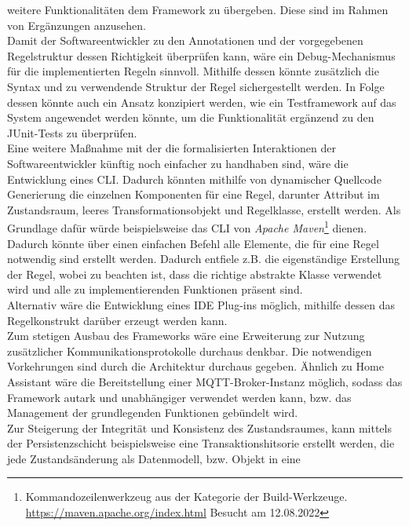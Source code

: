     weitere Funktionalitäten dem Framework zu übergeben. Diese sind im Rahmen von Ergänzungen anzusehen.
    \\
    Damit der Softwareentwickler zu den Annotationen und der vorgegebenen Regelstruktur dessen Richtigkeit überprüfen kann, wäre ein Debug-Mechanismus für die implementierten Regeln sinnvoll. 
    Mithilfe dessen könnte zusätzlich die Syntax und zu verwendende Struktur der Regel sichergestellt werden. In Folge dessen könnte auch ein Ansatz konzipiert werden, wie ein Testframework 
    auf das System angewendet werden könnte, um die Funktionalität ergänzend zu den JUnit-Tests zu überprüfen. 
    \\
    \linebreak
    Eine weitere Maßnahme mit der die formalisierten Interaktionen der Softwareentwickler künftig noch einfacher zu handhaben sind, wäre die Entwicklung eines \ac{CLI}. Dadurch könnten mithilfe 
    von dynamischer Quellcode Generierung die einzelnen Komponenten für eine Regel, darunter Attribut im Zustandsraum, leeres Transformationsobjekt und Regelklasse, erstellt werden. Als Grundlage dafür 
    würde beispielsweise das \acs{CLI} von \textit{Apache Maven}\footnote{Kommandozeilenwerkzeug aus der Kategorie der Build-Werkzeuge. \url{https://maven.apache.org/index.html} Besucht am 12.08.2022} 
    dienen. Dadurch könnte über einen einfachen Befehl alle Elemente, die für eine Regel notwendig sind erstellt werden. Dadurch entfiele z.B. die 
    eigenständige Erstellung der Regel, wobei zu beachten ist, dass die richtige abstrakte Klasse verwendet wird und alle zu implementierenden Funktionen präsent sind. 
    \\
    Alternativ wäre die Entwicklung eines \ac{IDE} Plug-ins möglich, mithilfe dessen das Regelkonstrukt darüber erzeugt werden kann. 
    \\
    \linebreak
    Zum stetigen Ausbau des Frameworks wäre eine Erweiterung zur Nutzung zusätzlicher Kommunikationsprotokolle durchaus denkbar. Die notwendigen Vorkehrungen sind durch die Architektur durchaus gegeben. 
    Ähnlich zu Home Assistant wäre die Bereitstellung einer \acs{MQTT}-Broker-Instanz möglich, sodass das Framework autark und unabhängiger verwendet werden kann, bzw. das Management der grundlegenden Funktionen 
    gebündelt wird. 
    \\
    \linebreak
    Zur Steigerung der Integrität und Konsistenz des Zustandsraumes, kann mittels der Persistenzschicht beispielsweise eine Transaktionshitsorie erstellt werden, die jede Zustandsänderung als Datenmodell, bzw. Objekt in eine 
